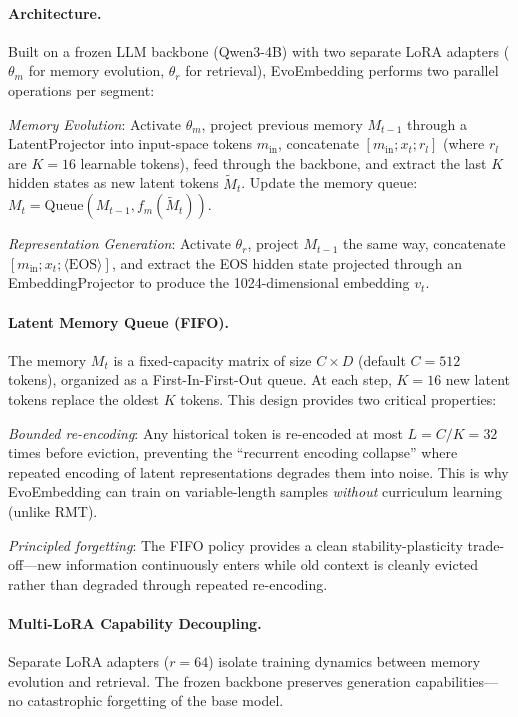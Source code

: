 \documentclass[11pt,a4paper]{article}
\begin{document}
\paragraph{Architecture.} Built on a frozen LLM backbone (Qwen3-4B) with two separate LoRA adapters ($\theta_m$ for memory evolution, $\theta_r$ for retrieval), EvoEmbedding performs two parallel operations per segment:

\emph{Memory Evolution}: Activate $\theta_m$, project previous memory $M_{t-1}$ through a LatentProjector into input-space tokens $m_{\mathrm{in}}$, concatenate $[m_{\mathrm{in}}; x_t; r_l]$ (where $r_l$ are $K=16$ learnable tokens), feed through the backbone, and extract the last $K$ hidden states as new latent tokens $\tilde{M}_t$. Update the memory queue: $M_t = \mathrm{Queue}(M_{t-1}, f_m(\tilde{M}_t))$.

\emph{Representation Generation}: Activate $\theta_r$, project $M_{t-1}$ the same way, concatenate $[m_{\mathrm{in}}; x_t; \langle\mathrm{EOS}\rangle]$, and extract the EOS hidden state projected through an EmbeddingProjector to produce the 1024-dimensional embedding $v_t$.

\paragraph{Latent Memory Queue (FIFO).} The memory $M_t$ is a fixed-capacity matrix of size $C \times D$ (default $C=512$ tokens), organized as a First-In-First-Out queue. At each step, $K=16$ new latent tokens replace the oldest $K$ tokens. This design provides two critical properties:

\emph{Bounded re-encoding}: Any historical token is re-encoded at most $L = C/K = 32$ times before eviction, preventing the ``recurrent encoding collapse'' where repeated encoding of latent representations degrades them into noise. This is why EvoEmbedding can train on variable-length samples \emph{without} curriculum learning (unlike RMT).

\emph{Principled forgetting}: The FIFO policy provides a clean stability-plasticity trade-off---new information continuously enters while old context is cleanly evicted rather than degraded through repeated re-encoding.

\paragraph{Multi-LoRA Capability Decoupling.} Separate LoRA adapters ($r=64$) isolate training dynamics between memory evolution and retrieval. The frozen backbone preserves generation capabilities---no catastrophic forgetting of the base model.
\end{document}
